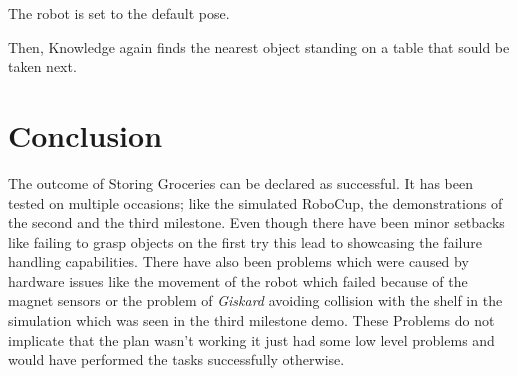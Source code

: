 \documentclass[main.tex]{subfiles}
\begin{document}
	
	The robot is set to the default pose.
	
	
	Then, Knowledge again finds the nearest object standing on a table that sould be taken next.
	
	
	
	
	\section{Conclusion}

	The outcome of Storing Groceries can be declared as successful. It has been tested on multiple occasions; like the simulated RoboCup, the demonstrations of the second and the third milestone. 
	Even though there have been minor setbacks like failing to grasp objects on the first try this lead to showcasing the failure handling capabilities.
	There have also been problems which were caused by hardware issues like the movement of the robot which failed because of the magnet sensors or the problem of \textit{Giskard} avoiding collision with the shelf in the simulation which was seen in the third milestone demo.
	These Problems do not implicate that the plan wasn't working it just had some low level problems and would have performed the tasks successfully otherwise.
	
	
	\endgroup
	
\end{document}
